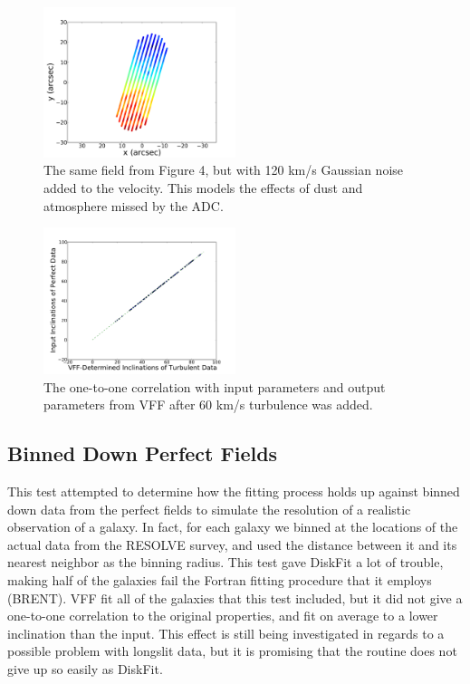\documentclass{emulateapj}
\begin{document}
\begin{figure}[h]
\includegraphics[width=0.5\textwidth]{turbexamp.pdf}
\caption{The same field from Figure 4, but with 120 km/s Gaussian noise added to the velocity. This models the effects of dust and atmosphere missed by the ADC.  \label{fig:test}}
\end{figure}

\begin{figure}[h]
\includegraphics[width=0.5\textwidth]{turbtest.pdf}
\caption{The one-to-one correlation with input parameters and output parameters from VFF after 60 km/s turbulence was added. \label{fig:test}}
\end{figure}

\subsection{Binned Down Perfect Fields}
\large This test attempted to determine how the fitting process holds up against binned down data from the perfect fields to simulate the resolution of a realistic observation of a galaxy. In fact, for each galaxy we binned at the locations of the actual data from the RESOLVE survey, and used the distance between it and its nearest neighbor as the binning radius. This test gave DiskFit a lot of trouble, making half of the galaxies fail the Fortran fitting procedure that it employs (BRENT). VFF fit all of the galaxies that this test included, but it did not give a one-to-one correlation to the original properties, and fit on average to a lower inclination than the input. This effect is still being investigated in regards to a possible problem with longslit data, but it is promising that the routine does not give up so easily as DiskFit.
\end{document}
